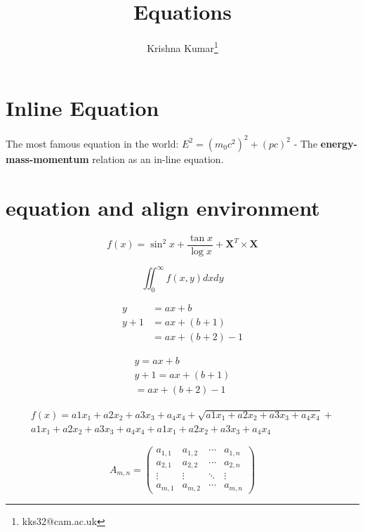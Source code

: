 \documentclass{article}
\title{Equations}
\author{Krishna Kumar\thanks{kks32@cam.ac.uk}}
\date{}
\begin{document}
\maketitle

\section*{Inline Equation}

The most famous equation in the world: $E^2 = (m_0c^2)^2 + (pc)^2$ - The \textbf{energy-mass-momentum} relation as an in-line equation.

\section{equation and align environment}
\begin{equation}
 f(x)= \sin^2x+\frac{\tan \mathit{x}}{\log \mathit{x}} + \mathbf{X}^T\times\mathbf{X}
\end{equation}

\begin{equation*}
\iint_{0}^{\infty}   f(x,y)dx dy
\end{equation*}


\begin{align}
	y   & = ax+b \nonumber\\
	y+1 & = ax+(b+1)\\
	    & = ax+(b+2)-1
\end{align}


\begin{gather}
	y   = ax+b \nonumber\\
	y+1 = ax+(b+1)\\
	    = ax+(b+2)-1
\end{gather}

\begin{multline}
f(x)=a1x_1+a2x_2+a3x_3+a_4x_4+
\sqrt{a1x_1+a2x_2+a3x_3+a_4x_4}+\\
a1x_1+a2x_2+a3x_3+a_4x_4+
a1x_1+a2x_2+a3x_3+a_4x_4
\end{multline}

\begin{equation}
A_{m,n} =
 \begin{pmatrix}
  a_{1,1} & a_{1,2} & \cdots & a_{1,n} \\
  a_{2,1} & a_{2,2} & \cdots & a_{2,n} \\
  \vdots  & \vdots  & \ddots & \vdots  \\
  a_{m,1} & a_{m,2} & \cdots & a_{m,n}
 \end{pmatrix}
\end{equation}
\end{document}
